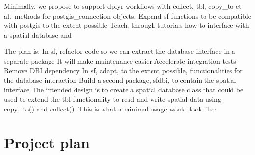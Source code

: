 \documentclass[]{article}
\newenvironment{Shaded}{\begin{snugshade}}{\end{snugshade}}
\newcommand{\CommentTok}[1]{\textcolor[rgb]{0.56,0.35,0.01}{\textit{#1}}}
\newcommand{\ControlFlowTok}[1]{\textcolor[rgb]{0.13,0.29,0.53}{\textbf{#1}}}
\newcommand{\DataTypeTok}[1]{\textcolor[rgb]{0.13,0.29,0.53}{#1}}
\newcommand{\DecValTok}[1]{\textcolor[rgb]{0.00,0.00,0.81}{#1}}
\newcommand{\KeywordTok}[1]{\textcolor[rgb]{0.13,0.29,0.53}{\textbf{#1}}}
\newcommand{\NormalTok}[1]{#1}
\newcommand{\OperatorTok}[1]{\textcolor[rgb]{0.81,0.36,0.00}{\textbf{#1}}}
\newcommand{\StringTok}[1]{\textcolor[rgb]{0.31,0.60,0.02}{#1}}
\begin{document}
Minimally, we propose to support dplyr workflows with collect, tbl,
copy\_to et al.~methods for postgis\_connection objects. Expand sf
functions to be compatible with postgis to the extent possible Teach,
through tutorials how to interface with a spatial database and

The plan is: In sf, refactor code so we can extract the database
interface in a separate package It will make maintenance easier
Accelerate integration tests Remove DBI dependency In sf, adapt, to the
extent possible, functionalities for the database interaction Build a
second package, sfdbi, to contain the spatial interface The intended
design is to create a spatial database class that could be used to
extend the tbl functionality to read and write spatial data using
copy\_to() and collect(). This is what a minimal usage would look like:

\begin{Shaded}
\end{Shaded}

\hypertarget{project-plan}{%
\section{Project plan}\label{project-plan}}
\end{document}
